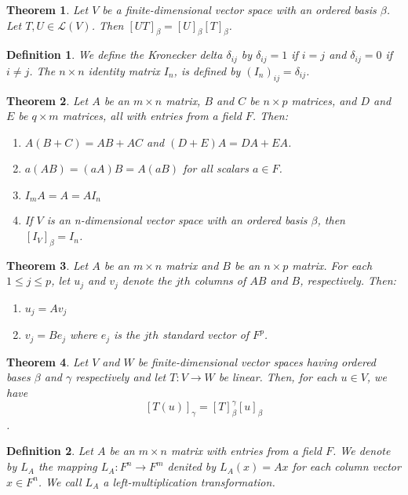 \documentclass[a4paper]{article}
\newtheorem{mytheorem}{Theorem}
\newtheorem{mydef}{Definition}
\numberwithin{mytheorem}{section}
\numberwithin{mydef}{section}
\numberwithin{example}{section}
\begin{document}
\begin{mytheorem}Let $V$ be a finite-dimensional vector space with an ordered basis $\beta$. Let $T,U \in \mathcal{L}(V)$. Then $[UT]_{\beta} = [U]_{\beta}[T]_{\beta}$.
\end{mytheorem}

\begin{mydef} We define the Kronecker delta $\delta_{ij}$ by $\delta_{ij} = 1$ if $i = j$ and $\delta_{ij} = 0$ if $i \neq j$. The $n \times n$ identity matrix $I_{n}$, is defined by $(I_{n})_{ij} = \delta_{ij}$.
\end{mydef}

\begin{mytheorem}Let $A$ be an $m \times n$ matrix, $B$ and $C$ be $n \times p$ matrices, and $D$ and $E$ be $q \times m$ matrices, all with entries from a field $F$. Then:
\begin{enumerate} 
\item $A(B+C) = AB + AC$ and $(D + E)A = DA + EA$.
\item $a(AB) = (aA)B = A(aB)$ for all scalars $a \in F$.
\item $I_{m}A = A = AI_{n}$
\item If $V$ is an n-dimensional vector space with an ordered basis $\beta$, then $[I_{V}]_{\beta} = I_{n}$.
\end{enumerate}
\end{mytheorem}

\begin{mytheorem}Let $A$ be an $m \times n$ matrix and $B$ be an $n \times p$ matrix. For each $1 \leq j \leq p$, let $u_{j}$ and $v_{j}$ denote the $jth$ columns of $AB$ and $B$, respectively. Then:
\begin{enumerate} 
\item $u_{j} = Av_{j}$
\item $v_{j} = Be_{j}$ where $e_{j}$ is the $jth$ standard vector of $F^{p}$.
\end{enumerate}
\end{mytheorem}

\begin{mytheorem} Let $V$ and $W$ be finite-dimensional vector spaces having ordered bases $\beta$ and $\gamma$ respectively and let $T: V \rightarrow W$ be linear. Then, for each $u \in V$, we have $$[T(u)]_{\gamma} = [T]^{\gamma}_{\beta}[u]_{\beta}$$. 
\end{mytheorem}

\begin{mydef} Let $A$ be an $m \times n$ matrix with entries from a field $F$. We denote by $L_{A}$ the mapping $L_{A} : F^{n} \rightarrow F^{m}$ denited by $L_{A}(x) = Ax$ for each column vector $x \in F^{n}$. We call $L_{A}$ a left-multiplication transformation.
\end{mydef}
\end{document}
